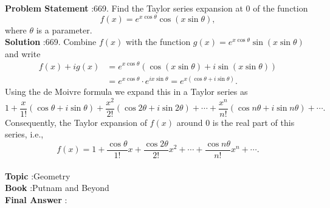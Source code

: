 \documentclass[10pt]{article}
\begin{document}
\textbf{Problem Statement} :669. Find the Taylor series expansion at 0 of the function$$ f(x)=e^{x \cos \theta} \cos (x \sin \theta), $$where $\theta$ is a parameter.\\
\textbf{Solution} :669. Combine $f(x)$ with the function $g(x)=e^{x \cos \theta} \sin (x \sin \theta)$ and write$$ \begin{aligned} f(x)+i g(x) &=e^{x \cos \theta}(\cos (x \sin \theta)+i \sin (x \sin \theta)) \\ &=e^{x \cos \theta} \cdot e^{i x \sin \theta}=e^{x(\cos \theta+i \sin \theta)} . \end{aligned} $$Using the de Moivre formula we expand this in a Taylor series as$$ 1+\frac{x}{1 !}(\cos \theta+i \sin \theta)+\frac{x^{2}}{2 !}(\cos 2 \theta+i \sin 2 \theta)+\cdots+\frac{x^{n}}{n !}(\cos n \theta+i \sin n \theta)+\cdots . $$Consequently, the Taylor expansion of $f(x)$ around 0 is the real part of this series, i.e.,$$ f(x)=1+\frac{\cos \theta}{1 !} x+\frac{\cos 2 \theta}{2 !} x^{2}+\cdots+\frac{\cos n \theta}{n !} x^{n}+\cdots . $$\\
\textbf{Topic} :Geometry\\
\textbf{Book} :Putnam and Beyond\\
\textbf{Final Answer} :\\
\end{document}
